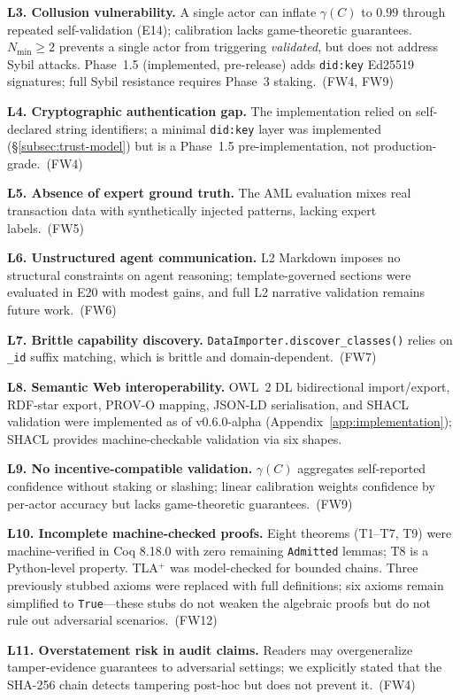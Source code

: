 \textbf{L3. Collusion vulnerability.} A single actor can inflate $\gamma(C)$ to $0.99$ through repeated self-validation (E14); calibration lacks game-theoretic guarantees. $N_{\min} \geq 2$ prevents a single actor from triggering \textit{validated}, but does not address Sybil attacks. Phase~1.5 (implemented, pre-release) adds \texttt{did:key} Ed25519 signatures; full Sybil resistance requires Phase~3 staking.~(FW4, FW9)

\textbf{L4. Cryptographic authentication gap.} The implementation relied on self-declared string identifiers; a minimal \texttt{did:key} layer was implemented (\S\ref{subsec:trust-model}) but is a Phase~1.5 pre-implementation, not production-grade.~(FW4)

\textbf{L5. Absence of expert ground truth.} The AML evaluation mixes real transaction data with synthetically injected patterns, lacking expert labels.~(FW5)

\textbf{L6. Unstructured agent communication.} L2 Markdown imposes no structural constraints on agent reasoning; template-governed sections were evaluated in E20 with modest gains, and full L2 narrative validation remains future work.~(FW6)

\textbf{L7. Brittle capability discovery.} \texttt{DataImporter.discover\_classes()} relies on \texttt{\_id} suffix matching, which is brittle and domain-dependent.~(FW7)

\textbf{L8. Semantic Web interoperability.} OWL~2 DL bidirectional import/export, RDF-star export, PROV-O mapping, JSON-LD serialisation, and SHACL validation were implemented as of v0.6.0-alpha (Appendix~\ref{app:implementation}); SHACL provides machine-checkable validation via six shapes.

\textbf{L9. No incentive-compatible validation.} $\gamma(C)$ aggregates self-reported confidence without staking or slashing; linear calibration weights confidence by per-actor accuracy but lacks game-theoretic guarantees.~(FW9)

\textbf{L10. Incomplete machine-checked proofs.} Eight theorems (T1--T7, T9) were machine-verified in Coq 8.18.0 with zero remaining \texttt{Admitted} lemmas; T8 is a Python-level property. TLA$^{+}$ was model-checked for bounded chains. Three previously stubbed axioms were replaced with full definitions; six axioms remain simplified to \texttt{True}---these stubs do not weaken the algebraic proofs but do not rule out adversarial scenarios.~(FW12)

\textbf{L11. Overstatement risk in audit claims.} Readers may overgeneralize tamper-evidence guarantees to adversarial settings; we explicitly stated that the SHA-256 chain detects tampering post-hoc but does not prevent it.~(FW4)


